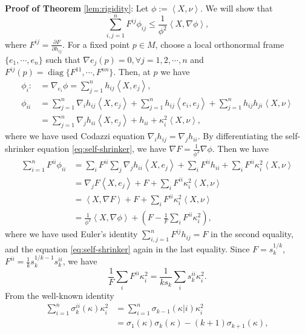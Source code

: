 \documentclass[10pt,a4paper]{amsart}
\newcommand{\pd}[2]{\frac{\partial {#1}}{\partial {#2}}}
\newcommand{\ip}[2]{\ensuremath{\left< {#1}, {#2} \right>}}
\newcommand{\diag}[1]{\ensuremath{\operatorname{diag}\{ #1 \}}}
\numberwithin{equation}{section}
\begin{document}
\textbf{Proof of Theorem }{\ref{lem:rigidity}}: 
    Let \(\phi := \ip{X}{\nu}\). We will show that 
    \[ \sum_{i,j=1}^{n} F^{ij}\phi_{ij} \leq \frac{1}{\phi^2}\ip{X}{\nabla \phi}, \]
    where \(F^{ij} = \pd{F}{h_{ij}}\). For a fixed point \(p\in M\), choose a local orthonormal frame \(\{e_1,\cdots,e_n\}\) such that \(\nabla e_j(p) = 0, \forall j=1,2,\cdots,n\) and \(F^{ij}(p) = \diag{F^{11},\cdots,F^{nn}}\). Then, at \(p\) we have 
    \[ \begin{aligned}
        \phi_i :&= \nabla_{e_i}\phi = \sum_{j=1}^n h_{ij}\ip{X}{e_j},\\
        \phi_{ii} &= \sum_{j=1}^{n}\nabla_i h_{ij}\ip{X}{e_j} + \sum_{j=1}^{n}h_{ij}\ip{e_i}{e_j} + \sum_{j=1}^{n}h_{ij}h_{ji}\ip{X}{\nu} \\
        &= \sum_{j=1}^{n}\nabla_j h_{ii}\ip{X}{e_j} + h_{ii} + \kappa_i^2\ip{X}{\nu},
    \end{aligned} \]
    where we have used Codazzi equation \(\nabla_i h_{ij} = \nabla_j h_{ii}\). By differentiating the self-shrinker equation \eqref{eq:self-shrinker}, we have \(\nabla F = \frac{1}{\phi^2}\nabla \phi\). Then we have 
    \begin{equation}\label{eq:rigid}
        \begin{aligned}
            \sum_{i=1}^{n} F^{ii} \phi_{ii} &= \sum_i F^{ii}\sum_j \nabla_j h_{ii}\ip{X}{e_j} + \sum_i F^{ii}h_{ii} + \sum_i F^{ii}\kappa_i^2 \ip{X}{\nu} \\
            &= \nabla_j F \ip{X}{e_j} + F + \sum_i F^{ii}\kappa_i^2 \ip{X}{\nu} \\
            &=  \ip{X}{\nabla F} + F + \sum_i F^{ii}\kappa_i^2 \ip{X}{\nu} \\
            &= \frac{1}{\phi^2}\ip{X}{\nabla \phi} + \left( F - \frac{1}{F}\sum_i F^{ii}\kappa_i^2\right), 
        \end{aligned}
    \end{equation} 
    where we have used Euler's identity \(\sum_{i,j=1}^{n}F^{ij}h_{ij} = F\) in the second equality, and the equation \eqref{eq:self-shrinker} again in the last equality. Since \(F = s_k^{1/k}\), \(F^{ii} = \frac{1}{k}s_k^{1/k-1}s_k^{ii}\),  we have 
    \[ \frac{1}{F}\sum_i F^{ii}\kappa_i^2 = \frac{1}{k s_k}\sum_i s_k^{ii}\kappa_i^2. \]
    From the well-known identity  
    \[ \begin{aligned}
        \sum_{i=1}^n \sigma_k^{ii}(\kappa)\kappa_i^2 &= \sum_{i=1}^n \sigma_{k-1}(\kappa | i) \kappa_i^2 \\
        &= \sigma_1(\kappa)\sigma_k(\kappa) - (k+1)\sigma_{k+1}(\kappa),
    \end{aligned}  \]
\end{document}
